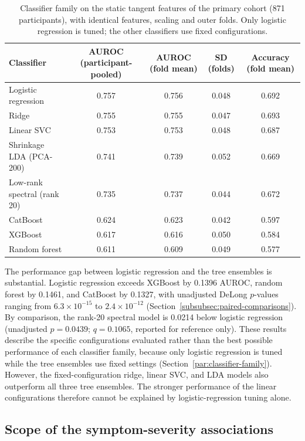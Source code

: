 \begin{table}[t]
\centering
\caption{Classifier family on the static tangent features of the primary cohort
(871 participants), with identical features, scaling and outer folds. Only logistic
regression is tuned; the other classifiers use fixed configurations.}
\label{tab:classifier-family}
\small
\setlength{\tabcolsep}{4pt}
\begin{tabular}{@{}lcccc@{}}
\toprule
Classifier & AUROC (participant-pooled) & AUROC (fold mean) & SD (folds) & Accuracy (fold mean) \\
\midrule
Logistic regression & 0.757 & 0.756 & 0.048 & 0.692 \\
Ridge & 0.755 & 0.755 & 0.047 & 0.693 \\
Linear SVC & 0.753 & 0.753 & 0.048 & 0.687 \\
Shrinkage LDA (PCA-200) & 0.741 & 0.739 & 0.052 & 0.669 \\
Low-rank spectral (rank 20) & 0.735 & 0.737 & 0.044 & 0.672 \\
CatBoost & 0.624 & 0.623 & 0.042 & 0.597 \\
XGBoost & 0.617 & 0.616 & 0.050 & 0.584 \\
Random forest & 0.611 & 0.609 & 0.049 & 0.577 \\
\bottomrule
\end{tabular}
\end{table}

The performance gap between logistic regression and the tree ensembles is substantial. Logistic regression exceeds XGBoost by 0.1396 AUROC, random forest by 0.1461, and CatBoost by 0.1327, with unadjusted DeLong $p$-values ranging from $6.3\times10^{-15}$ to $2.4\times10^{-12}$ (Section~\ref{subsubsec:paired-comparisons}). By comparison, the rank-20 spectral model is 0.0214 below logistic regression (unadjusted $p=0.0439$; $q=0.1065$, reported for reference only). These results describe the specific configurations evaluated rather than the best possible performance of each classifier family, because only logistic regression is tuned while the tree ensembles use fixed settings (Section~\ref{par:classifier-family}). However, the fixed-configuration ridge, linear SVC, and LDA models also outperform all three tree ensembles. The stronger performance of the linear configurations therefore cannot be explained by logistic-regression tuning alone.

\subsection{Scope of the symptom-severity associations}
\label{subsec:results-symptom-severity}

